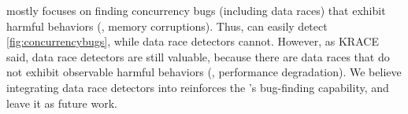 %
\sys mostly focuses on finding concurrency bugs (including data races)
that exhibit harmful behaviors (\eg, memory corruptions). Thus, \sys
can easily detect \autoref{fig:concurrencybugs}, while data race
detectors cannot.
%
However, as KRACE said, data race detectors are still valuable,
because there are data races that do not exhibit observable harmful
behaviors (\ie, performance degradation).
%
We believe integrating data race detectors into \sys reinforces the
\sys's bug-finding capability, and leave it as future work.


